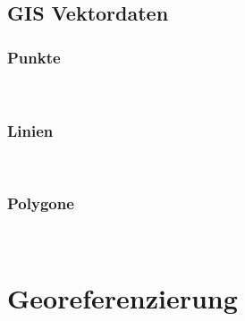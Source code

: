 \documentclass[10pt,conference,compsocconf]{IEEEtran}
\begin{document}
\subsection{GIS Vektordaten}

\subsubsection{Punkte}\hspace*{\fill} \\

\subsubsection{Linien}\hspace*{\fill} \\

\subsubsection{Polygone}\hspace*{\fill} \\






\section{Georeferenzierung}

\end{document}
